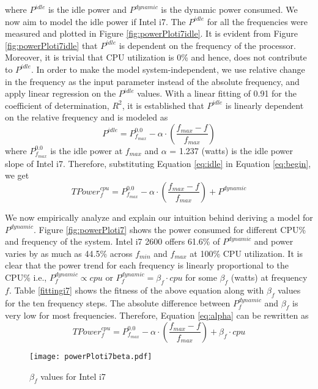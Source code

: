 \documentclass{sig-alternate}
\begin{document}
where $P^{idle}$ is the idle power and $P^{dynamic}$ is the dynamic power consumed. We now aim to model the idle power if Intel i7. The $P^{idle}$ for all the frequencies were measured and plotted in Figure \ref{fig:powerPloti7idle}. It is evident from Figure \ref{fig:powerPloti7idle} that $P^{idle}$ is dependent on the frequency of the processor. Moreover, it is trivial that CPU utilization is 0\% and hence, does not contribute to $P^{idle}$. In order to make the model system-independent, we use relative change in the frequency as the input parameter instead of the absolute frequency, and apply linear regression on the $P^{idle}$ values. With a linear fitting of 0.91 for the coefficient of determination, $R^2$, it is established that $P^{idle}$ is linearly dependent on the relative frequency and is modeled as \begin{equation}
P^{idle} = P^{0.0}_{f_{max}} - \alpha \cdot (\frac{f_{max} - f}{f_{max}})
\label{eq:idle}
\end{equation}
where $P^{0.0}_{f_{max}}$ is the idle power at $f_{max}$ and $\alpha$ = 1.237 (watts) is the idle power slope of Intel i7. Therefore, substituting Equation \ref{eq:idle} in Equation \ref{eq:begin}, we get \begin{equation}
\label{eq:alpha}
 TPower^{cpu}_{f} = P^{0.0}_{f_{max}} - \alpha \cdot (\frac{f_{max} - f}{f_{max}}) + P^{dynamic}
\end{equation}

We now empirically analyze and explain our intuition behind deriving a model for $P^{dynamic}$. Figure \ref{fig:powerPloti7} shows the power consumed for different CPU\% and frequency of the system. Intel i7 2600 offers 61.6\% of $P^{dynamic}$ and power varies by as much as 44.5\% across $f_{min}$ and $f_{max}$ at 100\% CPU utilization. It is clear that the power trend for each frequency is linearly proportional to the CPU\% i.e., $P^{dynamic}_f \propto cpu$ or $P^{dynamic}_f = \beta_f \cdot cpu$ for some $\beta_f$ (watts) at frequency $f$. Table \ref{fittingi7} shows the fitness of the above equation along with $\beta_f$ values for the ten frequency steps. The absolute difference between $P^{dynamic}_f$ and $\beta_f$ is very low for most frequencies. Therefore, Equation \ref{eq:alpha} can be rewritten as \begin{equation}
\label{eq:basicPower}
TPower^{cpu}_{f} = P^{0.0}_{f_{max}} - \alpha \cdot (\frac{f_{max} - f}{f_{max}}) + \beta_f \cdot cpu
\end{equation}
\begin{figure}[!htbp]
\begin{center}
 \texttt{[image: powerPloti7beta.pdf]}
\caption{$\beta_f$ values for Intel i7}
\label{fig:powerPloti7beta}
\end{center}
\vspace{-0.5cm}
\end{figure}
\end{document}
